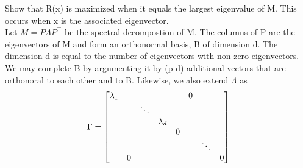 \documentclass[18pt]{article}
\begin{document}
\begin{flushleft}
\vspace{.4cm}
Show that R(x) is maximized when it equals the largest eigenvalue of M. This\\
occurs when x is the associated eigenvector.\\
\vspace{.4cm}
Let $M=P \Lambda P^{\top}$ be the spectral decompostion of M. The columns of P are the \\
eigenvectors of M and form an orthonormal basis, B of dimension d. The dimension d is equal to the number of eigenvectors with non-zero
eigenvectors. We may complete B by argumenting it by (p-d) additional vectors that are orthonoral to each other and to B. Likewise, we also extend $\Lambda$ as\\
$$
\Gamma=
\begin{bmatrix}
   \lambda_1 & & & & &\huge0\\ 
   &  &  \ddots & & & \\
   &  &  & \lambda_d & &  \\
   &  &  &  & 0 & \\
   &  &  &  & & & \ddots &\\
   &\huge0  &  &  &  & & & 0
\end{bmatrix}
$$


\end{flushleft}
\end{document}
